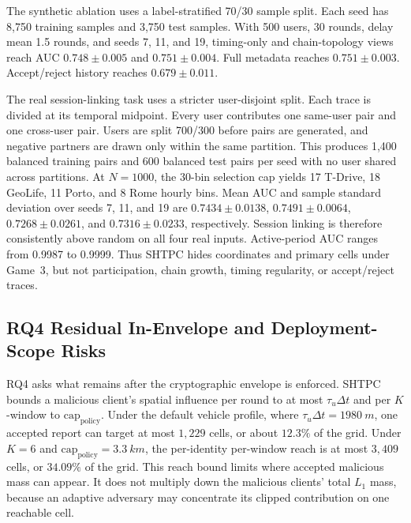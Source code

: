 \documentclass[journal]{IEEEtran}
\theoremstyle{definition}
\theoremstyle{plain}
\begin{document}
The synthetic ablation uses a label-stratified 70/30 sample split. Each seed
has 8,750 training samples and 3,750 test samples. With 500 users, 30 rounds,
delay mean 1.5 rounds, and seeds 7, 11, and 19, timing-only and chain-topology
views reach AUC \(0.748\pm0.005\) and \(0.751\pm0.004\). Full metadata reaches
\(0.751\pm0.003\). Accept/reject history reaches \(0.679\pm0.011\).

The real session-linking task uses a stricter user-disjoint split. Each trace
is divided at its temporal midpoint. Every user contributes one same-user pair
and one cross-user pair. Users are split 700/300 before pairs are generated,
and negative partners are drawn only within the same partition. This produces
1,400 balanced training pairs and 600 balanced test pairs per seed with no user
shared across partitions. At \(N=1000\), the 30-bin selection cap yields 17
T-Drive, 18 GeoLife, 11 Porto, and 8 Rome hourly bins. Mean AUC and sample
standard deviation over seeds 7, 11, and 19 are
\(0.7434\pm0.0138\), \(0.7491\pm0.0064\), \(0.7268\pm0.0261\), and
\(0.7316\pm0.0233\), respectively. Session linking is therefore consistently
above random on all four real inputs. Active-period AUC ranges from 0.9987 to
0.9999. Thus \textsc{SHTPC} hides coordinates and primary cells under Game~3,
but not participation, chain growth, timing regularity, or accept/reject traces.

\subsection{RQ4 Residual In-Envelope and Deployment-Scope Risks}
\label{sec:eval-reach}

RQ4 asks what remains after the cryptographic envelope is enforced.
\textsc{SHTPC} bounds a malicious client's spatial influence per round to at most
$\tau_u\Delta t$ and per $K$-window to $\mathrm{cap}_{\mathrm{policy}}$. Under
the default vehicle profile, where $\tau_u\Delta t=\SI{1980}{m}$, one accepted
report can target at most $1{,}229$ cells, or about $12.3\%$ of the grid. Under
$K{=}6$ and $\mathrm{cap}_{\mathrm{policy}}=\SI{3.3}{km}$, the per-identity
per-window reach is at most $3{,}409$ cells, or $34.09\%$ of the grid.
This reach bound limits where accepted malicious mass can appear. It does not
multiply down the malicious clients' total \(L_1\) mass, because an adaptive adversary may
concentrate its clipped contribution on one reachable cell.
\end{document}
